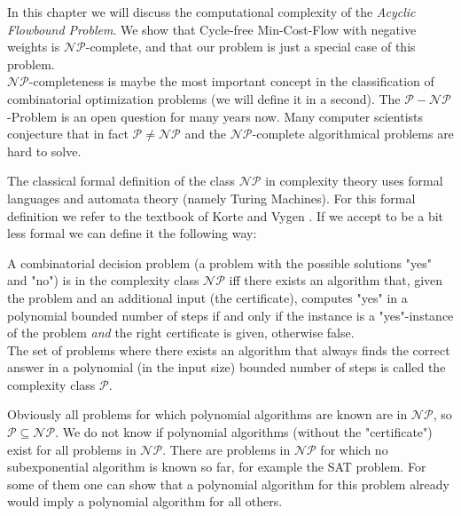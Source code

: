 In this chapter we will discuss the computational complexity of the \textit{Acyclic Flowbound Problem}. We show that 
Cycle-free Min-Cost-Flow with negative weights is $\mathcal{NP}$-complete, and that our problem is just a special case 
of this problem. \\

$\mathcal{NP}$-completeness is maybe the most important concept in the classification of combinatorial optimization 
problems (we will define it in a second). The $\mathcal{P-NP}$-Problem is an open question for many years now. Many 
computer scientists conjecture that in fact $\mathcal{P}\neq \mathcal{NP}$ and the $\mathcal{NP}$-complete algorithmical 
problems are hard to solve. 

The classical formal definition of the class $\mathcal{NP}$ in complexity theory uses formal languages and automata 
theory (namely Turing Machines). For this formal definition we refer to the textbook of Korte and Vygen 
\cite{KorteVygenCombOpt2007}. If we accept to be a bit less formal we can define it the following way:
\begin{definition}


A combinatorial decision problem (a problem with the possible solutions "yes" and "no") is in the complexity class 
$\mathcal{NP}$ iff there exists an algorithm that, given the problem and an additional input (the certificate), 
computes "yes" in a polynomial bounded number of steps if and only if the instance is a "yes"-instance of the problem 
\textit{and} the right certificate is given, otherwise false.\\
The set of problems where there exists an algorithm that always finds the correct answer in a polynomial (in the input 
size) bounded number of steps is called the complexity class $\mathcal{P}$. 
\end{definition}

Obviously all problems for which polynomial algorithms are known are in $\mathcal{NP}$, so 
$\mathcal{P}\subseteq\mathcal{NP}$. We do not know if polynomial algorithms (without the "certificate") exist for all 
problems in $\mathcal{NP}$. There are problems in $\mathcal{NP}$ for which no subexponential algorithm is known so far, 
for example the SAT problem. For some of them one can show that a polynomial algorithm for this problem already would 
imply a polynomial algorithm for all others. 

